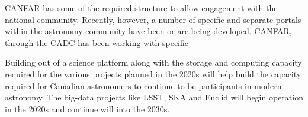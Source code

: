 \documentclass[11pt]{article}
\begin{document}
\begin{lrptextbox} 
CANFAR has some of the required structure to allow engagement with the national community.  Recently, however, a number of  specific and separate portals within the astronomy community have been or are being developed. 
CANFAR, through the CADC has been working with specific 
\end{lrptextbox}


\begin{lrptextbox} 
Building out of a science platform along with the storage and computing capacity required for the various projects planned in the 2020s will help build the capacity required for Canadian astronomers to continue to be participants in modern astronomy.  The big-data projects like LSST, SKA and Euclid will begin operation in the 2020s and continue will into the 2030s.

\end{lrptextbox}
\end{document}
